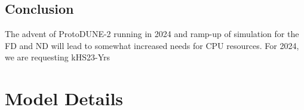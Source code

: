 \documentclass[12pt]{article}
\begin{document}
\subsection{Conclusion}\label{sec:cpuresult} The advent of ProtoDUNE-2 running in 2024 and ramp-up of simulation for the FD and ND will lead to somewhat increased needs for CPU resources.  For 2024, we are requesting \CPUTotal  kHS23-Yrs
%



\clearpage
\appendix

%
%
%
%
%
%
%
\section{Model Details}
\end{document}
